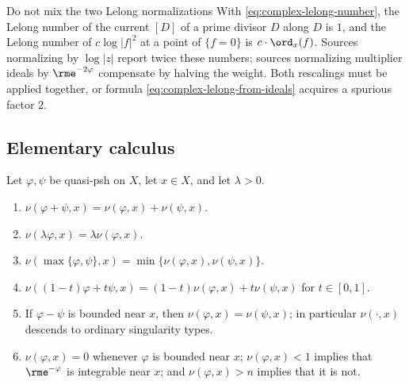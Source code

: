 \begin{warning}{Do not mix the two Lelong normalizations}
\label{warn:ch51-lelong-normalization}
With \eqref{eq:complex-lelong-number}, the Lelong number of the current
\([D]\) of a prime divisor \(D\) along \(D\) is \(1\), and the Lelong
number of \(c\log|f|^2\) at a point of \(\{f=0\}\) is
\(c\cdot\ord_x(f)\).  Sources normalizing by \(\log|z|\) report twice
these numbers; sources normalizing multiplier ideals by
\(\rme^{-2\varphi}\) compensate by halving the weight.  Both rescalings
must be applied together, or formula
\eqref{eq:complex-lelong-from-ideals} acquires a spurious factor \(2\).
\end{warning}

\subsection{Elementary calculus}
\label{sec:ch51-lelong-calculus}

\begin{proposition}\label{prop:ch51-lelong-calculus}
Let \(\varphi,\psi\) be quasi-psh on \(X\), let \(x\in X\), and let
\(\lambda>0\).
\begin{enumerate}
\item\label{itm:ch51-lc:sum}
      \(\nu(\varphi+\psi,x)=\nu(\varphi,x)+\nu(\psi,x)\).
\item\label{itm:ch51-lc:scale}
      \(\nu(\lambda\varphi,x)=\lambda\nu(\varphi,x)\).
\item\label{itm:ch51-lc:max}
      \(\nu(\max\{\varphi,\psi\},x)=\min\{\nu(\varphi,x),\nu(\psi,x)\}\).
\item\label{itm:ch51-lc:convex}
      \(\nu((1-t)\varphi+t\psi,x)=(1-t)\nu(\varphi,x)+t\nu(\psi,x)\) for
      \(t\in[0,1]\).
\item\label{itm:ch51-lc:bounded}
      If \(\varphi-\psi\) is bounded near \(x\), then
      \(\nu(\varphi,x)=\nu(\psi,x)\); in particular \(\nu(\cdot,x)\)
      descends to ordinary singularity types.
\item\label{itm:ch51-lc:smooth}
      \(\nu(\varphi,x)=0\) whenever \(\varphi\) is bounded near \(x\);
      \(\nu(\varphi,x)<1\) implies that \(\rme^{-\varphi}\) is integrable
      near \(x\); and \(\nu(\varphi,x)>n\) implies that it is not.
\end{enumerate}
\end{proposition}

